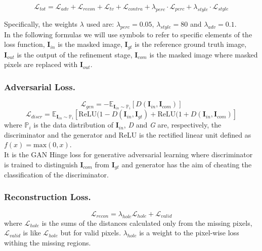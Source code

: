 \documentclass[10pt,twocolumn,letterpaper]{article}
\begin{document}
\begin{dmath}
      \mathcal{L}_{tot} = \mathcal{L}_{adv} + \mathcal{L}_{recon} +
      \mathcal{L}_{tv} + \mathcal{L}_{contra} + \lambda_{perc} \cdot
      \mathcal{L}_{perc} + \lambda_{style} \cdot \mathcal{L}_{style}
\end{dmath}

Specifically, the weights $\lambda$ used are: $\lambda_{perc} = 0.05$,
$\lambda_{style} = 80$ and $\lambda_{adv} = 0.1$.\\
In the following formulas we will use symbols to refer to specific elements of
the loss function, $\mathbf{I}_{in}$ is the masked image, $\mathbf{I}_{gt}$ is
the reference ground truth image, $\mathbf{I}_{out}$ is the output of the
refinement stage, $\mathbf{I}_{com}$ is the masked image where masked pixels are
replaced with $\mathbf{I}_{out}$. \\

\subsubsection{Adversarial Loss.}
\begin{dmath}
    \mathcal{L}_{gen} = -\mathbb{E}_{\mathbf{I}_{in} \sim \mathbb{P}_i}
    [D(\mathbf{I}_{in},\mathbf{I}_{com})]
\end{dmath}
\begin{dmath}
    \mathcal{L}_{discr} = \mathbb{E}_{\mathbf{I}_{in} \sim \mathbb{P}_i}
    [\mathrm{ReLU}(1-D(\mathbf{I}_{in},\mathbf{I}_{gt}) +
    \mathrm{ReLU}(1+D(\mathbf{I}_{in},\mathbf{I}_{com})]
\end{dmath}
where \(\mathbb{P}_i\) is the data distribution of $\mathbf{I}_{in}$, \textit{D}
and \textit{G} are, respectively, the discriminator and the generator and ReLU
is the rectified linear unit defined as \(f(x) = \mathrm{max}(0,x)\).\\ It is
the GAN Hinge loss for generative adversarial learning where discriminator is
trained to distinguish $\mathbf{I}_{com}$ from $\mathbf{I}_{gt}$ and generator
has the aim of cheating the classification of the discriminator.

\subsubsection{Reconstruction Loss.}
\begin{dmath}
    \mathcal{L}_{recon} = \lambda_{hole} \mathcal{L}_{hole} +
    \mathcal{L}_{valid}
\end{dmath}
where \(\mathcal{L}_{hole}\) is the sums of the distances calculated only from
the missing pixels, \(\mathcal{L}_{valid}\) is like \(\mathcal{L}_{hole}\) but
for valid pixels. \(\lambda_{hole}\) is a weight to the pixel-wise loss withing
the missing regions.
\end{document}

